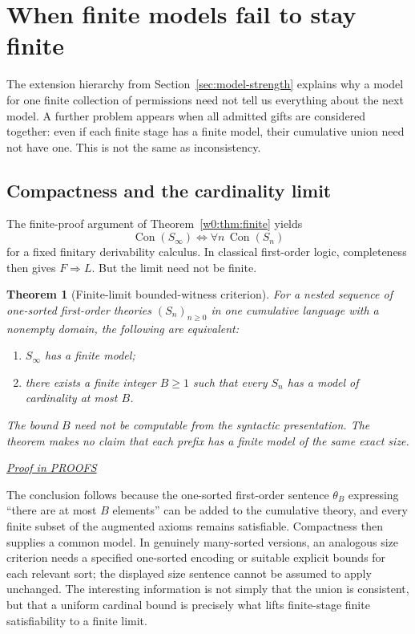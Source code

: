 \documentclass[11pt,letterpaper]{article}
\newtheorem{theorem}{Theorem}[section]
\theoremstyle{definition}\newtheorem{definition}[theorem]{Definition}\newtheorem{example}[theorem]{Example}
\theoremstyle{remark}\newtheorem{remark}[theorem]{Remark}
\newcommand{\Con}{\operatorname{Con}}
\newcommand{\prooflink}[1]{\par\noindent\hfill\small\hyperref[#1]{\textit{Proof in PROOFS}}\normalsize}
\begin{document}
\section{When finite models fail to stay finite}\label{sec:limit-braid}
The extension hierarchy from Section~\ref{sec:model-strength} explains why a
model for one finite collection of permissions need not tell us everything
about the next model. A further problem appears when all admitted gifts are
considered together: even if each finite stage has a finite model, their
cumulative union need not have one. This is not the same as inconsistency.

\subsection{Compactness and the cardinality limit}
The finite-proof argument of Theorem~\ref{w0:thm:finite} yields
\[
 \Con(S_\infty)\iff \forall n\,\Con(S_n)
\]
for a fixed finitary derivability calculus. In classical first-order logic, completeness then gives $F\Rightarrow L$. But the limit need not be finite.

\begin{theorem}[Finite-limit bounded-witness criterion]\label{w2:th:bounded}
For a nested sequence of \emph{one-sorted} first-order theories $(S_n)_{n\ge0}$ in one cumulative language with a nonempty domain, the following are equivalent:
\begin{enumerate}[label=\textup{(\alph*)}]
\item $S_\infty$ has a finite model;
\item there exists a finite integer $B\ge1$ such that \emph{every} $S_n$ has a model of cardinality at most $B$.
\end{enumerate}
The bound $B$ need not be computable from the syntactic presentation. The theorem makes no claim that each prefix has a finite model of the \emph{same} exact size.
\prooflink{w2:pr:bounded}
\end{theorem}

The conclusion follows because the one-sorted first-order sentence $\theta_B$ expressing ``there are at most $B$ elements'' can be added to the cumulative theory, and every finite subset of the augmented axioms remains satisfiable. Compactness then supplies a common model. In genuinely many-sorted versions, an analogous size criterion needs a specified one-sorted encoding or suitable explicit bounds for each relevant sort; the displayed size sentence cannot be assumed to apply unchanged. The interesting information is not simply that the union is consistent, but that a uniform cardinal bound is precisely what lifts finite-stage finite satisfiability to a finite limit.
\end{document}
